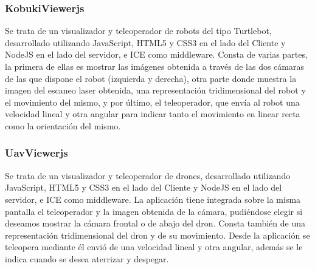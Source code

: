 \subsubsection{KobukiViewerjs}

Se trata de un visualizador y teleoperador de robots del tipo Turtlebot, desarrollado utilizando JavaScript, HTML5 y CSS3 en el lado del Cliente y NodeJS en el lado del servidor, e ICE como middleware. Consta de varias partes, la primera de ellas es mostrar las imágenes obtenida a través de las dos cámaras de las que dispone el robot (izquierda y derecha), otra parte donde muestra la imagen del escaneo laser obtenida, una representación tridimensional del robot y el movimiento del mismo, y por último, el teleoperador, que envía al robot una velocidad lineal y otra angular para indicar tanto el movimiento en linear recta como la orientación del mismo.

\subsubsection{UavViewerjs}

Se trata de un visualizador y teleoperador de drones, desarrollado utilizando JavaScript, HTML5 y CSS3 en el lado del Cliente y NodeJS en el lado del servidor, e ICE como middleware. La aplicación tiene integrada sobre la misma pantalla el teleoperador y la imagen obtenida de la cámara, pudiéndose elegir si deseamos mostrar la cámara frontal o de abajo del dron. Consta también de una representación tridimensional del dron y de su movimiento. Desde la aplicación se teleopera mediante él envió de una velocidad lineal y otra angular, además se le indica cuando se desea aterrizar y despegar.
